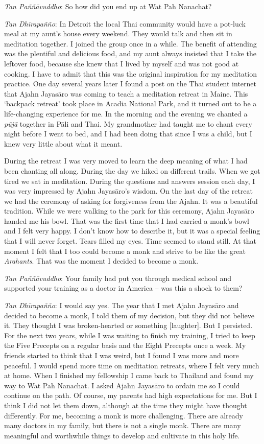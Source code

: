 \emph{Tan Paññāvuddho}: So how did you end up at Wat Pah Nanachat? 

\emph{Tan Dhīrapañño}: In Detroit the local Thai community would have a
pot-luck meal at my aunt's house every weekend. They would talk and then
sit in meditation together. I joined the group once in a while. The
benefit of attending was the plentiful and delicious food, and my aunt
always insisted that I take the leftover food, because she knew that I
lived by myself and was not good at cooking. I have to admit that this
was the original inspiration for my meditation practice. One day several
years later I found a post on the Thai student internet that Ajahn
Jayasāro was coming to teach a meditation retreat in Maine. This
`backpack retreat' took place in Acadia National Park, and it turned out
to be a life-changing experience for me. In the morning and the evening
we chanted a \emph{pūjā} together in Pāli and Thai. My grandmother had
taught me to chant every night before I went to bed, and I had been
doing that since I was a child, but I knew very little about what it
meant.

During the retreat I was very moved to learn the deep meaning of
what I had been chanting all along. During the day we hiked on different
trails. When we got tired we sat in meditation. During the questions and
answers session each day, I was very impressed by Ajahn Jayasāro's
wisdom. On the last day of the retreat we had the ceremony of asking for
forgiveness from the Ajahn. It was a beautiful tradition. While we were
walking to the park for this ceremony, Ajahn Jayasāro handed me his
bowl. That was the first time that I had carried a monk's bowl and I
felt very happy. I don't know how to describe it, but it was a special
feeling that I will never forget. Tears filled my eyes. Time seemed to
stand still. At that moment I felt that I too could become a monk and
strive to be like the great \emph{Arahants}. That was the moment I
decided to become a monk. 

\emph{Tan Paññāvuddho}: Your family had put you through medical school
and supported your training as a doctor in America -- was this a shock
to them? 

\emph{Tan Dhīrapañño}: I would say yes. The year that I met Ajahn
Jayasāro and decided to become a monk, I told them of my decision, but
they did not believe it. They thought I was broken-hearted or something
[laughter]. But I persisted. For the next two years, while I was
waiting to finish my training, I tried to keep the Five Precepts on a
regular basis and the Eight Precepts once a week. My friends started to
think that I was weird, but I found I was more and more peaceful. I
would spend more time on meditation retreats, where I felt very much at
home. When I finished my fellowship I came back to Thailand and found my
way to Wat Pah Nanachat. I asked Ajahn Jayasāro to ordain me so I could
continue on the path. Of course, my parents had high expectations for
me. But I think I did not let them down, although at the time they might
have thought differently. For me, becoming a monk is more challenging. 
There are already many doctors in my family, but there is not a single
monk. There are many meaningful and worthwhile things to develop and
cultivate in this holy life. 

